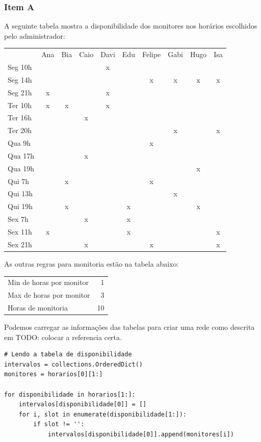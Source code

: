 \documentclass[11pt]{article}
\begin{document}
\subsubsection{Item A}
\label{sec-1-6-1}
A seguinte tabela mostra a disponibilidade dos monitores nos horários
escolhidos pelo administrador:

\begin{center}
\begin{tabular}{lccccccccc}
 & Ana & Bia & Caio & Davi & Edu & Felipe & Gabi & Hugo & Isa\\
Seg 10h &  &  &  & x &  &  &  &  & \\
Seg 14h &  &  &  &  &  & x & x & x & x\\
Seg 21h & x &  &  & x &  &  &  &  & \\
Ter 10h & x & x &  & x &  &  &  &  & \\
Ter 16h &  &  & x &  &  &  &  &  & \\
Ter 20h &  &  &  &  &  &  & x &  & x\\
Qua 9h &  &  &  &  &  & x &  &  & \\
Qua 17h &  &  & x &  &  &  &  &  & \\
Qua 19h &  &  &  &  &  &  &  & x & \\
Qui 7h &  & x &  &  &  & x &  &  & \\
Qui 13h &  &  &  &  &  &  & x &  & \\
Qui 19h &  & x &  &  & x &  &  & x & \\
Sex 7h &  &  & x &  & x &  &  &  & \\
Sex 11h & x &  &  &  & x &  &  &  & x\\
Sex 21h &  &  & x &  &  & x &  &  & x\\
\end{tabular}
\end{center}
As outras regras para monitoria estão na tabela abaixo:

\begin{center}
\begin{tabular}{lr}
Min de horas por monitor & 1\\
Max de horas por monitor & 3\\
Horas de monitoria & 10\\
\end{tabular}
\end{center}

Podemos carregar as informações das tabelas para criar uma rede como
descrita em TODO: colocar a referencia certa.
\begin{verbatim}
# Lendo a tabela de disponibilidade
intervalos = collections.OrderedDict()
monitores = horarios[0][1:]

for disponibilidade in horarios[1:]:
    intervalos[disponibilidade[0]] = []
    for i, slot in enumerate(disponibilidade[1:]):
        if slot != '':
            intervalos[disponibilidade[0]].append(monitores[i])
\end{verbatim}
\end{document}
